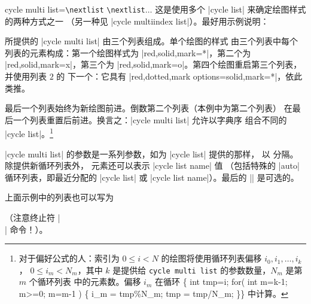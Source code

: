\begin{pgfplotskey}{%
    cycle multi list=\texttt{\textbackslash nextlist}%
    \texttt{\textbackslash nextlist}$\ldots$
}
    这是使用多个 |cycle list| 来确定绘图样式的两种方式之一
    （另一种见 |cycle multiindex list|）。最好用示例说明：
\begin{codeexample}[]
\end{codeexample}
    \noindent 所提供的 |cycle multi list| 由三个列表组成。单个绘图的样式
    由三个列表中每个列表的元素构成：第一个绘图样式为
    |red,solid,mark=*|，第二个为 |red,solid,mark=x|，第三个为
    |red,solid,mark=o|。第四个绘图重启第三个列表，并使用列表 $2$ 的
    下一个：它具有 |red,dotted,mark options={solid},mark=*|，依此类推。

    最后一个列表始终为新绘图前进。倒数第二个列表（本例中为第二个列表）
    在最后一个列表重置后前进。换言之：|cycle multi list| 允许以字典序
    组合不同的 |cycle list|。\footnote{对于偏好公式的人：索引为
    $0 \le i < N$ 的绘图将使用循环列表偏移 $i_0,i_1,\dotsc,i_k$，
    $0 \le i_m < N_m$，其中 $k$ 是提供给
    \texttt{cycle multi list} 的参数数量，$N_m$ 是第 $m$ 个循环列表
    中的元素数。偏移 $i_m$ 在循环
    {\ttfamily \{ int tmp=i; for( int m=k-1; m>=0; m=m-1 ) \{ i\_m =
    tmp\%N\_m; tmp = tmp/N\_m; \}\}} 中计算。}

    |cycle multi list| 的参数是一系列参数，如为 |cycle list| 提供的那样，
    以 \declareandlabel{\nextlist} 分隔。除提供新循环列表外，
     元素还可以表示 |cycle list name| 值
    （包括特殊的 |auto| 循环列表，即最近分配的 |cycle list| 或
    |cycle list name|）。最后的 |\nextlist| 是可选的。

    上面示例中的列表也可以写为
    \noindent （注意终止符 |\\| 命令！）。


\end{pgfplotskey}
